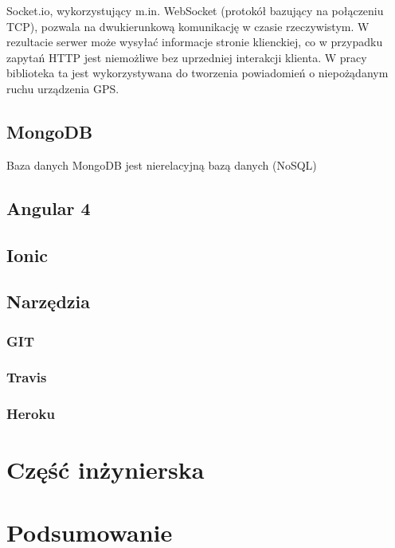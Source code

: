 \documentclass[eng,printmode]{mgr}
\begin{document}
Socket.io, wykorzystujący m.in. WebSocket (protokół bazujący na połączeniu TCP), pozwala na dwukierunkową komunikację w czasie rzeczywistym. W rezultacie serwer może wysyłać informacje stronie klienckiej, co w przypadku zapytań HTTP jest niemożliwe bez uprzedniej interakcji klienta. W pracy biblioteka ta jest wykorzystywana do tworzenia powiadomień o niepożądanym ruchu urządzenia GPS.

\section{MongoDB}
Baza danych MongoDB jest nierelacyjną bazą danych (NoSQL)
\section{Angular 4}
\section{Ionic}
\section{Narzędzia}
\subsection{GIT}
\subsection{Travis}
\subsection{Heroku}

\chapter{Część inżynierska}
\cite{Node.js}

\chapter{Podsumowanie}

 
\end{document}
